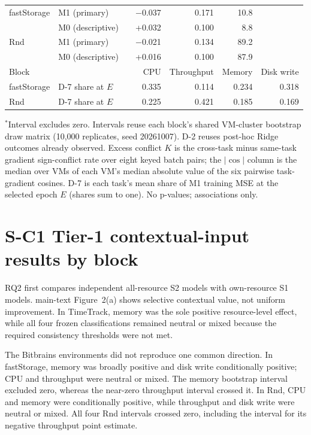 \documentclass[a4paper,11pt]{article}
\begin{document}
\begin{table}[t]
\begin{tabular*}{\textwidth}{@{\extracolsep{\fill}}lllrrrr@{}}
    \midrule
    fastStorage & M1 (primary) & & $-$0.037 & 0.171 & 10.8 & \\
     & M0 (descriptive) & & +0.032 & 0.100 & 8.8 & \\
    Rnd & M1 (primary) & & $-$0.021 & 0.134 & 89.2 & \\
     & M0 (descriptive) & & +0.016 & 0.100 & 87.9 & \\
    \midrule
    Block & & & CPU & Throughput & Memory & Disk write \\
    \midrule
    fastStorage & D-7 share at $E$ & & 0.335 & 0.114 & 0.234 & 0.318 \\
    Rnd & D-7 share at $E$ & & 0.225 & 0.421 & 0.185 & 0.169 \\
    \bottomrule
  \end{tabular*}

  \vspace{2pt}
  \parbox{\textwidth}{\footnotesize $^{*}$Interval excludes zero. Intervals reuse each block's shared VM-cluster bootstrap draw matrix (10{,}000 replicates, seed 20261007). D-2 reuses post-hoc Ridge outcomes already observed. Excess conflict $K$ is the cross-task minus same-task gradient sign-conflict rate over eight keyed batch pairs; the $|\cos|$ column is the median over VMs of each VM's median absolute value of the six pairwise task-gradient cosines. D-7 is each task's mean share of M1 training MSE at the selected epoch $E$ (shares sum to one). No p-values; associations only.}
\end{table}

\clearpage
\section*{S-C1 Tier-1 contextual-input results by block}
RQ2 first compares independent all-resource S2 models with own-resource
S1 models. main-text Figure~2(a) shows selective
contextual value, not uniform improvement. In TimeTrack, memory was the sole
positive resource-level effect, while all four frozen classifications remained
neutral or mixed because the required consistency thresholds were not met.

The Bitbrains environments did not reproduce one common direction. In
fastStorage, memory was broadly positive and disk write conditionally positive;
CPU and throughput were neutral or mixed. The memory bootstrap interval
excluded zero, whereas the near-zero throughput interval crossed it. In Rnd,
CPU and memory were conditionally positive, while throughput and disk write
were neutral or mixed. All four Rnd intervals crossed zero, including the
interval for its negative throughput point estimate.
\end{document}
